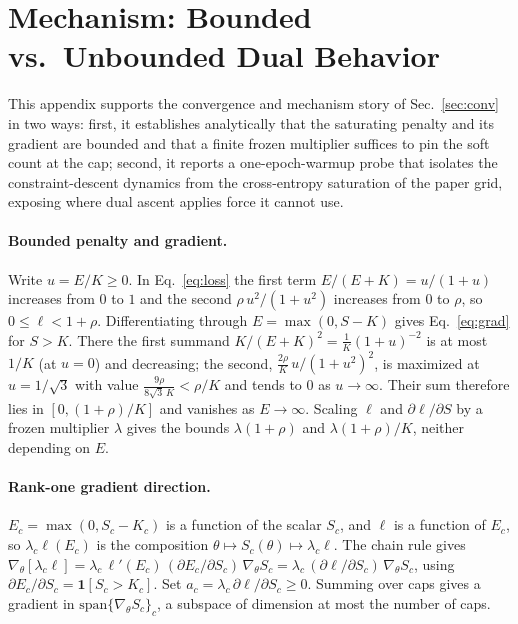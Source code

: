 \documentclass[10pt]{article}
\begin{document}



\appendix

\section{Mechanism: Bounded vs.\ Unbounded Dual Behavior}
\label{app:mech}

This appendix supports the convergence and mechanism story of
Sec.~\ref{sec:conv} in two ways: first, it establishes analytically that
the saturating penalty and its gradient are bounded and that a finite
frozen multiplier suffices to pin the soft count at the cap; second, it
reports a one-epoch-warmup probe that isolates the constraint-descent
dynamics from the cross-entropy saturation of the paper grid, exposing
where dual ascent applies force it cannot use.

\paragraph{Bounded penalty and gradient.}
Write $u=E/K\ge 0$. In Eq.~\eqref{eq:loss} the first term $E/(E+K)=u/(1+u)$
increases from $0$ to $1$ and the second $\rho\,u^2/(1+u^2)$ increases from
$0$ to $\rho$, so $0\le\ell<1+\rho$. Differentiating through
$E=\max(0,S-K)$ gives Eq.~\eqref{eq:grad} for $S>K$. There the first
summand $K/(E+K)^2=\tfrac1K(1+u)^{-2}$ is at most $1/K$ (at $u{=}0$) and
decreasing; the second, $\tfrac{2\rho}{K}\,u/(1+u^2)^2$, is maximized at
$u=1/\sqrt3$ with value $\tfrac{9\rho}{8\sqrt3\,K}<\rho/K$ and tends to
$0$ as $u\to\infty$. Their sum therefore lies in $[0,(1+\rho)/K]$ and
vanishes as $E\to\infty$. Scaling $\ell$ and $\partial\ell/\partial S$ by
a frozen multiplier $\lambda$ gives the bounds $\lambda(1+\rho)$ and
$\lambda(1+\rho)/K$, neither depending on $E$.

\paragraph{Rank-one gradient direction.}
$E_c=\max(0,S_c-K_c)$ is a function of the scalar $S_c$, and $\ell$ is a
function of $E_c$, so $\lambda_c\ell(E_c)$ is the composition
$\theta\mapsto S_c(\theta)\mapsto\lambda_c\ell$. The chain rule gives
$\nabla_\theta[\lambda_c\ell]=\lambda_c\,\ell'(E_c)\,(\partial
E_c/\partial S_c)\,\nabla_\theta S_c=\lambda_c\,(\partial\ell/\partial
S_c)\,\nabla_\theta S_c$, using
$\partial E_c/\partial S_c=\mathbf 1[S_c>K_c]$. Set
$a_c=\lambda_c\,\partial\ell/\partial S_c\ge 0$. Summing over caps gives
a gradient in $\mathrm{span}\{\nabla_\theta S_c\}_c$, a subspace of
dimension at most the number of caps.
\end{document}
